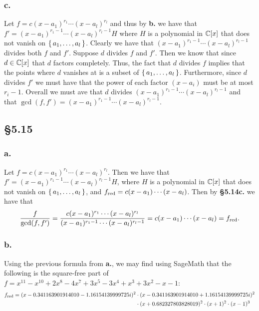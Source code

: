 \documentclass[letterpaper]{article}
\begin{document}
\subsubsection*{c.}

Let $f = c(x - a_{1})^{r_{1}} \cdots (x - a_{l})^{r_{l}}$ and thus by \textbf{b.} we have that $f' = (x - a_{1})^{r_{1} - 1} \cdots (x - a_{l})^{r_{l} - 1} H$ where $H$ is a polynomial in $\mathbb{C}[x]$ that does not vanish on $\set{a_{1}, \ldots, a_{l}}$. Clearly we have that $(x - a_{1})^{r_{1} - 1} \cdots (x - a_{l})^{r_{l} - 1}$ divides both $f$ and $f'$. Suppose $d$ divides $f$ and $f'$. Then we know that since $d \in \mathbb{C}[x]$ that $d$ factors completely. Thus, the fact that $d$ divides $f$ implies that the points where $d$ vanishes at is a subset of $\set{a_{1}, \ldots, a_{l}}$. Furthermore, since $d$ divides $f'$ we must have that the power of each factor $(x -a_{i})$ must be at most $r_{i} - 1$. Overall we must ave that $d$ divides $(x - a_{1})^{r_{1} - 1} \cdots (x - a_{l})^{r_{l} - 1}$ and that $\gcd(f, f') = (x - a_{1})^{r_{1} - 1} \cdots (x - a_{l})^{r_{l} - 1}$.

\subsection*{\S 5.15}

\subsubsection*{a.}

Let $f = c(x - a_{1})^{r_{1}} \cdots (x - a_{l})^{r_{l}}$. Then we have that $f' = (x - a_{1})^{r_{1} - 1} \cdots (x - a_{l})^{r_{l} - 1} H$, where $H$ is a polynomial in $\mathbb{C}[x]$ that does not vanish on $\set{a_{1}, \ldots, a_{l}}$, and $f_{\text{red}} = c (x - a_{1}) \cdots (x - a_{l})$. Then by \textbf{\S 5.14c.} we have that
\[
  \frac{f}{\gcd(f, f')} = \frac{c(x - a_{1})^{r_{1}} \cdots (x - a_{l})^{r_{l}}}{(x - a_{1})^{r_{1} - 1} \cdots (x - a_{l})^{r_{l} - 1}} = c (x - a_{1}) \cdots (x - a_{l}) = f_{\text{red}}.
\]

\subsubsection*{b.}

Using the previous formula from \textbf{a.}, we may find using SageMath that the following is the square-free part of $f = x^{11} - x^{10} + 2x^{8} - 4x^{7} + 3x^{5} - 3x^{4} + x^{3} + 3x^{2} - x - 1$:
\begin{equation*}
\begin{split}
  f_{\text{red}} = (x - 0.341163901914010 - 1.16154139999725i)^{2} &\cdot (x - 0.341163901914010 + 1.16154139999725i)^{2} \\
    &\cdot (x + 0.682327803828019)^{2} \cdot (x + 1)^{2} \cdot (x - 1)^{3}
\end{split}
\end{equation*}
\end{document}
